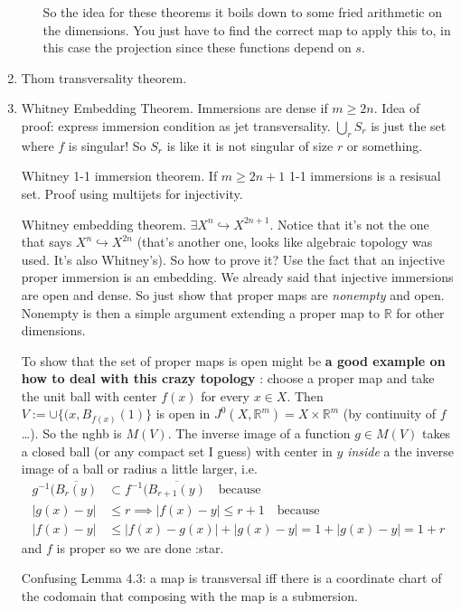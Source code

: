 \begin{enumerate}
\begin{enumerate}
			So the idea for these theorems it boils down to some fried arithmetic on the dimensions. You just have to find the correct map to apply this to, in this case the projection since these functions depend on \(s\).
		\end{enumerate}
	\item Thom transversality theorem.

	\item Whitney Embedding Theorem. Immersions are dense if \(m \geq 2n\). Idea of proof: express immersion condition as jet transversality. \(\bigcup_{r}S_r\) is just the set where \(f \) is singular! So \(S_r\) is like it is not singular of size \(r\) or something.

	Whitney 1-1 immersion theorem. If  \(m \geq 2n+1\) 1-1 immersions is a resisual set. Proof using multijets for injectivity.

	Whitney embedding theorem. \(\exists X^{n} \hookrightarrow X^{2n+1}\). Notice that it's not the one that says \(X^n \hookrightarrow X^{2n}\) (that's another one, looks like algebraic topology was used. It's also Whitney's). So how to prove it? Use the fact that an injective proper immersion is an embedding. We already said that injective immersions are open and dense. So just show that proper maps are \textit{nonempty} and open. Nonempty is then a simple argument extending a proper map to \(\mathbb{R}\) for other dimensions.

	To show that the set of proper maps is open might be \textbf{a good example on how to deal with this crazy topology} : choose a proper map and take the unit ball with center \(f(x)\) for every \(x \in X\). Then \(V:=\cup \{(x,B_{f(x)}(1)\}\) is open in \(J^0(X,\mathbb{R}^m)=X \times \mathbb{R}^m\) (by continuity of \(f\)…). So the nghb is \(M(V)\). The inverse image of a function \(g \in M(V)\) takes a closed ball (or any compact set I guess) with center in \(y\) \textit{inside} a the inverse image of a ball or radius a little larger, i.e.
	\begin{align*}
	g^{-1}(\overline{B_r(y)}&\subset f^{-1}(\overline{B_{r+1}(y)}\quad \text{because} \\
	|g(x)-y|&\leq r \implies |f(x)-y|\leq r+1 \quad \text{because} \\
	|f(x)-y|&\leq |f(x)-g(x)|+|g(x)-y|=1+|g(x)-y|=1+r
	\end{align*}
	and \(f\) is proper so we are done :star.

	Confusing Lemma 4.3: a map is transversal iff there is a coordinate chart of the codomain that composing with the map is a submersion.


\end{enumerate}
